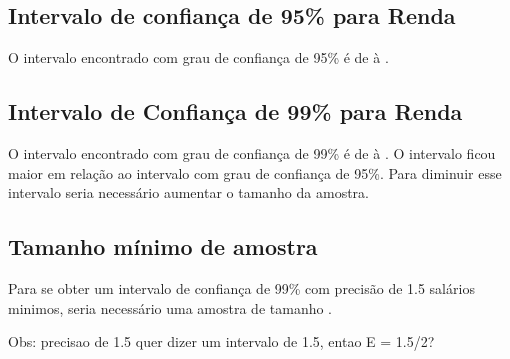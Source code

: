 

\subsection{Intervalo de confiança de 95\% para Renda}
O intervalo encontrado com grau de confiança de 95\% é de \TRESicmin à \TRESicmax.

\subsection{Intervalo de Confiança de 99\% para Renda}
O intervalo encontrado com grau de confiança de 99\% é de \TRESicNoveNoveMin à \TRESicNoveNoveMax.
O intervalo ficou maior em relação ao intervalo com grau de confiança de 95\%.{}
Para diminuir esse intervalo seria necessário aumentar o tamanho da amostra.

\subsection{Tamanho mínimo de amostra}
Para se obter um intervalo de confiança de 99\% com precisão de \num{1.5} salários
minimos, seria necessário uma amostra de tamanho \TRESnZero.

Obs: precisao de \num{1.5} quer dizer um intervalo de \num{1.5}, entao E = \num{1.5}/2?
